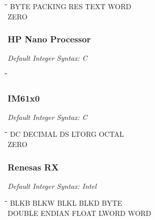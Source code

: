 {\tt\begin{tabbing}
\hspace{3cm}\=\hspace{3cm}\=\hspace{3cm}\=\hspace{3cm}\=\kill
BYTE       \> PACKING     \> RES         \> TEXT        \> WORD \\
ZERO \\
\end{tabbing}}

\subsubsection{HP Nano Processor}

{\em Default Integer Syntax: C }

{\tt\begin{tabbing}
\hspace{3cm}\=\hspace{3cm}\=\hspace{3cm}\=\hspace{3cm}\=\kill
\end{tabbing}}

\subsubsection{IM61x0}

{\em Default Integer Syntax: C}

{\tt\begin{tabbing}
\hspace{3cm}\=\hspace{3cm}\=\hspace{3cm}\=\hspace{3cm}\=\kill
DC         \> DECIMAL     \> DS          \> LTORG       \> OCTAL \\
ZERO \\
\end{tabbing}}

\subsubsection{Renesas RX}

{\em Default Integer Syntax: Intel}

{\tt\begin{tabbing}
\hspace{3cm}\=\hspace{3cm}\=\hspace{3cm}\=\hspace{3cm}\=\kill
BLKB       \> BLKW        \> BLKL        \> BLKD        \> BYTE \\
DOUBLE     \> ENDIAN      \> FLOAT       \> LWORD       \> WORD \\
\end{tabbing}}


